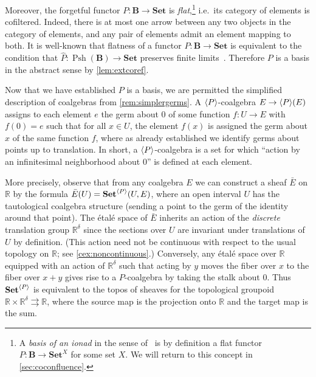 \documentclass[11pt, oneside, article]{memoir}
\theoremstyle{plain}
\theoremstyle{definition}
\theoremstyle{remark}
\newenvironment{example}
{\renewcommand\qedsymbol{$\lrcorner$}%
  \pushQED{\qed}\myexample}
{\popQED\endmyexample}
\DeclareMathOperator{\Psh}{Psh}
\DeclarePairedDelimiter{\gen}{\langle}{\rangle}
\newcommand{\namedcat}[1]{\mathbf{#1}}
\newcommand{\cat}[1]{\mathbf{#1}}
\newcommand{\Set}{\namedcat{Set}}
\newcommand{\CoalgOn}[2]{{#2}^{#1}}
\newcommand{\CoalgSet}[1]{\CoalgOn{#1}{\Set}}
\newcommand{\extend}[1]{\widehat{#1}}
\newcommand{\ph}[1]{#1}
\newcommand{\Ps}[1]{\Psh(#1)}
\newcommand{\eE}{E}
\newcommand{\xX}{X}
\newcommand{\bB}{\cat{B}}
\newcommand{\pP}{\ph{P}}
\newcommand{\cP}{\gen{\pP}}
\newcommand{\PSet}{\CoalgSet{\cP}}
\newcommand{\rr}{\mathbb{R}}
\begin{document}
\begin{example}[Infinitesimal group actions]
  Moreover, the forgetful functor $\pP \colon \bB \to \Set$ is
  \emph{flat},\footnote{A \emph{basis of an ionad} in the sense
    of~\cite{garner:ionads} is by definition a flat functor
    $\pP \colon \bB \to \Set^\xX$ for some set $\xX$. We will return
    to this concept in \cref{sec:coconfluence}.} i.e.\ its category of
  elements is cofiltered. Indeed, there is at most one arrow between
  any two objects in the category of elements, and any pair of
  elements admit an element mapping to both. It is well-known that
  flatness of a functor $\pP \colon\bB \to \Set$ is equivalent to
  the condition that $\extend{\pP} \colon \Ps{\bB} \to \Set$ preserves
  finite limits~\cite[Proposition 6.3.8]{borceux:i}. Therefore $\pP$
  is a basis in the abstract sense by \cref{lem:extcoref}.

  Now that we have established $\pP$ is a basis, we are permitted the
  simplified description of coalgebras from \cref{rem:simplergerms}. A
  $\cP$-coalgebra $\eE \to \cP(\eE)$ assigns to each element $e$ the
  germ about $0$ of some function $f \colon U \to \eE$ with $f(0) = e$
  such that for all $x \in U$, the element $f(x)$ is assigned the germ
  about $x$ of the same function $f$, where as already established we
  identify germs about points up to translation. In short, a
  $\cP$-coalgebra is a set for which ``action by an infinitesimal
  neighborhood about $0$'' is defined at each element.

  More precisely, observe that from any coalgebra $\eE$ we can
  construct a sheaf $\bar \eE$ on $\rr$ by the formula
  $\bar \eE(U) = \PSet(U,\eE)$, where an open interval $U$ has the
  tautological coalgebra structure (sending a point to the germ of the
  identity around that point). The \'etal\'e space of $\bar \eE$
  inherits an action of the \emph{discrete} translation group
  $\rr^\delta$ since the sections over $U$ are invariant under
  translations of $U$ by definition. (This action need not be
  continuous with respect to the usual topology on $\rr$; see
  \cref{cex:noncontinuous}.) Conversely, any \'etal\'e space over $\rr$
  equipped with an action of $\rr^\delta$ such that acting by $y$
  moves the fiber over $x$ to the fiber over $x + y$ gives rise to a
  $\pP$-coalgebra by taking the stalk about $0$. Thus $\PSet$ is
  equivalent to the topos of sheaves for the topological groupoid
  $\rr \times \rr^\delta \rightrightarrows \rr$, where the source map
  is the projection onto $\rr$ and the target map is the sum.



\end{example}
\end{document}
